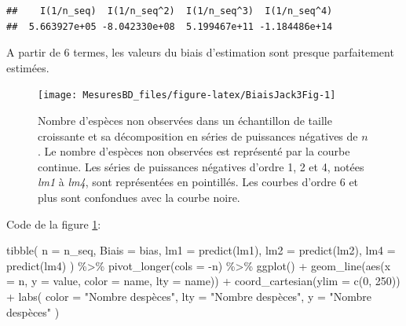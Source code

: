 \documentclass[
  11pt,
  american,
  a4paper,
  extrafontsizes,onecolumn,openright
  ]{memoir}
\newenvironment{Shaded}{\begin{snugshade}}{\end{snugshade}}
\newcommand{\AttributeTok}[1]{\textcolor[rgb]{0.77,0.63,0.00}{#1}}
\newcommand{\DecValTok}[1]{\textcolor[rgb]{0.00,0.00,0.81}{#1}}
\newcommand{\FunctionTok}[1]{\textcolor[rgb]{0.00,0.00,0.00}{#1}}
\newcommand{\NormalTok}[1]{#1}
\newcommand{\SpecialCharTok}[1]{\textcolor[rgb]{0.00,0.00,0.00}{#1}}
\newcommand{\StringTok}[1]{\textcolor[rgb]{0.31,0.60,0.02}{#1}}
\newlength{\rf}
\begin{document}
\begin{verbatim}
##    I(1/n_seq)  I(1/n_seq^2)  I(1/n_seq^3)  I(1/n_seq^4) 
##  5.663927e+05 -8.042330e+08  5.199467e+11 -1.184486e+14
\end{verbatim}

\normalsize
A partir de 6 termes, les valeurs du biais d'estimation sont presque parfaitement estimées.



\scriptsize

\begin{figure}

{\centering \texttt{[image: MesuresBD\_files/figure-latex/BiaisJack3Fig-1]} 

}

\caption{Nombre d'espèces non observées dans un échantillon de taille croissante et sa décomposition en séries de puissances négatives de \(n\). Le nombre d'espèces non observées est représenté par la courbe continue. Les séries de puissances négatives d'ordre 1, 2 et 4, notées \emph{lm1} à \emph{lm4}, sont représentées en pointillés. Les courbes d'ordre 6 et plus sont confondues avec la courbe noire.}\label{fig:BiaisJack3Fig}
\end{figure}

\normalsize

Code de la figure \ref{fig:BiaisJack3Fig}:

\scriptsize

\begin{Shaded}
\begin{Highlighting}[]
\FunctionTok{tibble}\NormalTok{(}
  \AttributeTok{n =}\NormalTok{ n\_seq, }
  \AttributeTok{Biais =}\NormalTok{ bias, }
  \AttributeTok{lm1 =} \FunctionTok{predict}\NormalTok{(lm1),}
  \AttributeTok{lm2 =} \FunctionTok{predict}\NormalTok{(lm2), }
  \AttributeTok{lm4 =} \FunctionTok{predict}\NormalTok{(lm4)}
\NormalTok{) }\SpecialCharTok{\%\textgreater{}\%} 
  \FunctionTok{pivot\_longer}\NormalTok{(}\AttributeTok{cols =} \SpecialCharTok{{-}}\NormalTok{n) }\SpecialCharTok{\%\textgreater{}\%} 
  \FunctionTok{ggplot}\NormalTok{() }\SpecialCharTok{+}
    \FunctionTok{geom\_line}\NormalTok{(}\FunctionTok{aes}\NormalTok{(}\AttributeTok{x =}\NormalTok{ n, }\AttributeTok{y =}\NormalTok{ value, }\AttributeTok{color =}\NormalTok{ name, }\AttributeTok{lty =}\NormalTok{ name)) }\SpecialCharTok{+}
    \FunctionTok{coord\_cartesian}\NormalTok{(}\AttributeTok{ylim =} \FunctionTok{c}\NormalTok{(}\DecValTok{0}\NormalTok{, }\DecValTok{250}\NormalTok{)) }\SpecialCharTok{+}
    \FunctionTok{labs}\NormalTok{(}
      \AttributeTok{color =} \StringTok{"Nombre d\textquotesingle{}espèces"}\NormalTok{, }
      \AttributeTok{lty =} \StringTok{"Nombre d\textquotesingle{}espèces"}\NormalTok{,}
      \AttributeTok{y =} \StringTok{"Nombre d\textquotesingle{}espèces"}
\NormalTok{    )}
\end{Highlighting}
\end{Shaded}
\end{document}
